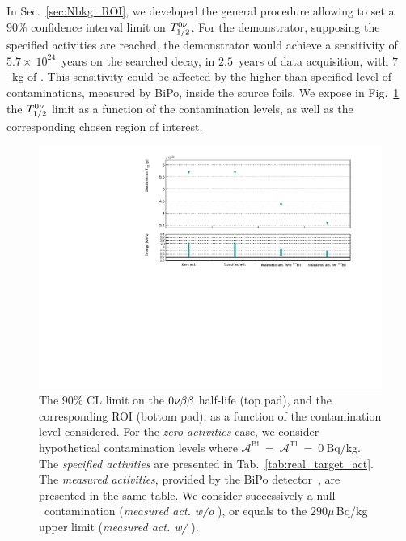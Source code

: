 In Sec.~\ref{sec:Nbkg_ROI}, we developed the general procedure allowing to set a $90\%$ confidence interval limit on $T_{1/2}^{0\nu}$.
For the demonstrator, supposing the specified activities are reached, the demonstrator would achieve a sensitivity of $5.7\times~10^{24}$~years on the searched decay, in $2.5$~years of data acquisition, with $7$~kg of \Se.
This sensitivity could be affected by the higher-than-specified level of contaminations, measured by BiPo, inside the source foils.
We expose in Fig.~\ref{fig:real_target_act} the $T_{1/2}^{0\nu}$ limit as a function of the contamination levels, as well as the corresponding chosen region of interest.
\begin{figure}[h]
  \centering
  \includegraphics[width=1.1\textwidth]{Sensitivity/fig_sensitivity/contamination_level_Se_B.pdf}
  \caption{The $90\%$ CL limit on the $0\nu\beta\beta$ half-life (top pad), and the corresponding ROI (bottom pad), as a function of the contamination level considered.
    For the \emph{zero activities} case, we consider hypothetical contamination levels where $\mathcal{A}^{\text{Bi}}~=~\mathcal{A}^{\text{Tl}}~=~0~$Bq/kg.
    The \emph{specified activities} are presented in Tab.~\ref{tab:real_target_act}.
    The \emph{measured activities}, provided by the BiPo detector~\cite{internal:bipo}, are presented in the same table.
    We consider successively a null \Bi\ contamination (\emph{measured act. w/o \Bi}), or equals to the $290\mu\,$Bq/kg upper limit (\emph{measured act. w/ \Bi}).
    \label{fig:real_target_act}}
\end{figure}
